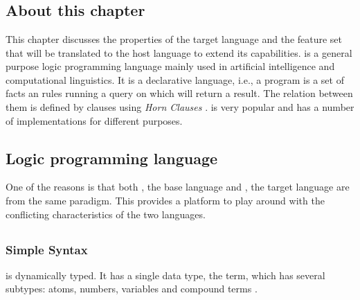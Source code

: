 \documentclass[thesis-solanki.tex]{subfiles}
\begin{document}
\chapter{}\label{chap:pwp}


\section{About this chapter}

This chapter discusses the properties of the target language  and the feature set that will be translated to the host 
language to extend its capabilities.
 is a general purpose logic programming language mainly used in artificial intelligence and
  computational linguistics.
  It is a declarative language, i.e., a program is a set of facts an rules running a
  query on which will return a result.
  The relation between them is defined by clauses using \textit{Horn Clauses} \cite{wikiprolog}.
   is very popular and has a number of implementations
  \cite{website:comparisonofprologimplementationswiki} for different purposes.
  
\section{Logic programming language}


One of the reasons is that both , the base language and , the target language are from the same paradigm.
This provides a platform to play around with the conflicting characteristics of the two languages.

\section{}


\subsection{Simple Syntax}

 is dynamically typed. It has a single data type, the term, which has several subtypes: atoms, numbers, variables and 
compound terms \cite{wikiprolog}.
\end{document}
